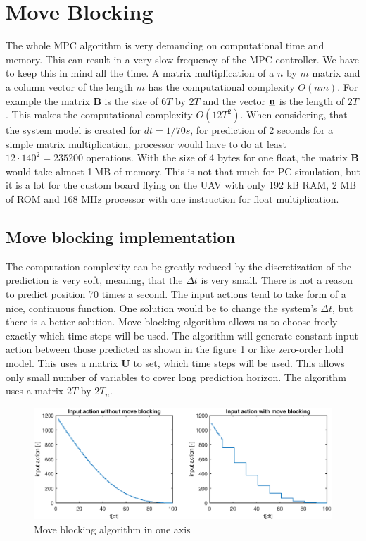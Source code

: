 \documentclass[a4paper,11pt,titlepage]{article}
\newcommand{\uvec}{\textbf{\underline{u}}}
\newcommand{\jed}[1]{\ensuremath{~\mathrm{#1}}}
\begin{document}
\section{Move Blocking}

The whole MPC algorithm is very demanding on computational time and memory. This can result in a very slow frequency of the MPC controller. We have to keep this in mind all the time. A matrix multiplication of a $n$ by $m$ matrix and a column vector of the length $m$ has the computational complexity $O(nm)$. For example the matrix $\textbf{\^B}$ is the size of $6T$ by $2T$ and the vector $\uvec$ is the length of $2T$. This makes the computational complexity $O(12T^2)$. When considering, that the system model is created for $dt = 1/70s$, for prediction of 2 seconds for a simple matrix multiplication, processor would have to do at least $12 \cdot  140^2 = 235 200$ operations. With the size of 4 bytes for one float, the matrix $\textbf{\^B}$ would take almost 1\jed{MB} of memory. This is not that much for PC simulation, but it is a lot for the custom board flying on the UAV with only 192 kB RAM, 2 MB of ROM and 168 MHz processor with one instruction for float multiplication. 

\subsection{Move blocking implementation}
The computation complexity can be greatly reduced by the discretization of the prediction is very soft, meaning, that the $\Delta t$ is very small. There is not a reason to predict position 70 times a second. The input actions tend to take form of a nice, continuous function. One solution would be to change the system's $\Delta t$, but there is a better solution. Move blocking algorithm allows us to choose freely exactly which time steps will be used. The algorithm will generate constant input action between those predicted as shown in the figure \ref{fig:move_blocking} or like zero-order hold model. This uses a matrix $\textbf{U}$ to set, which time steps will be used. This allows only small number of variables to cover long prediction horizon. The algorithm uses a matrix $2T$ by $2T_n$.

\begin{figure}[h]
\includegraphics[width=1\textwidth]{fig/move_blocking_u.eps}
\caption{Move blocking algorithm in one axis}
\label{fig:move_blocking}
\end{figure}
\end{document}
